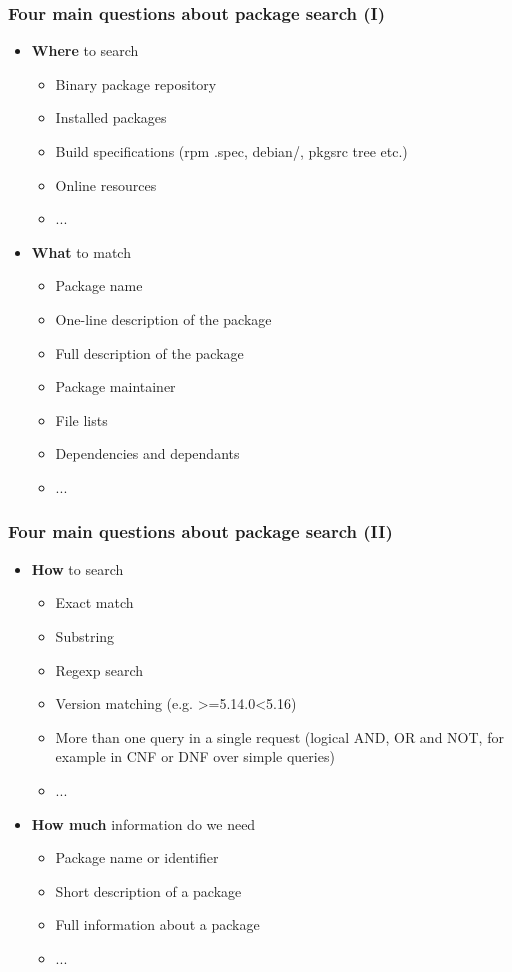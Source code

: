 \documentclass[hyperref=unicode,ascii,xcolor=dvipsnames]{beamer}
\begin{document}
\begin{frame}[fragile]
  \frametitle{Four main questions about package search (I)}
  \begin{itemize}
  \item {\bf Where} to search
    \begin{itemize}
    \item Binary package repository
    \item Installed packages
    \item Build specifications (rpm .spec, debian/, pkgsrc tree etc.)
    \item Online resources
    \item ...
    \end{itemize}
  \item {\bf What} to match
    \begin{itemize}
    \item Package name
    \item One-line description of the package
    \item Full description of the package
    \item Package maintainer
    \item File lists
    \item Dependencies and dependants
    \item ...
    \end{itemize}
  \end{itemize}
\end{frame}


\begin{frame}[fragile]
  \frametitle{Four main questions about package search (II)}
  \begin{itemize}
  \item {\bf How} to search
    \begin{itemize}
    \item Exact match
    \item Substring
    \item Regexp search
    \item Version matching (e.g. >=5.14.0<5.16)
    \item More than one query in a single request (logical AND, OR
      and NOT, for example in CNF or DNF over simple queries)
    \item ...
    \end{itemize}
  \item {\bf How much} information do we need
    \begin{itemize}
    \item Package name or identifier
    \item Short description of a package
    \item Full information about a package
    \item ...
    \end{itemize}
  \end{itemize}
\end{frame}
\end{document}
